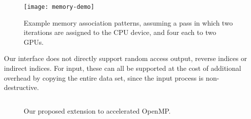 \begin{figure}
  \centering
  \texttt{[image: memory-demo]}
  \caption{Example memory association patterns, assuming a pass in which two
    iterations are assigned to the CPU device, and four each to two GPUs.}
  \label{fig:memory-demo}
\end{figure}





Our interface does not directly support random access output, reverse indices
or indirect indices. For input, these can all be supported at the cost of
additional overhead by copying the entire data set, since the input process
is non-destructive.


\begin{figure}[t]
  \centering
  \begin{minipage}[b]{\columnwidth}
    \inputminted[fontsize=\scriptsize,frame=single]{c}{snippets/auto.c}
  \end{minipage}
  \caption{Our proposed extension to accelerated OpenMP.}
  \label{fig:ctsar-ext}
\end{figure}


